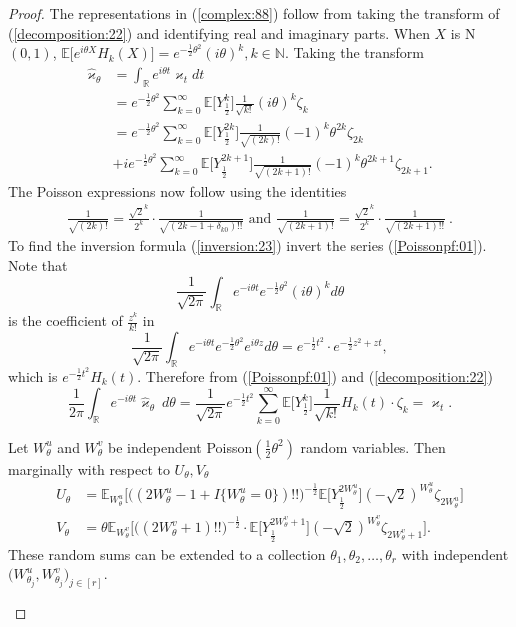 \documentclass[10pt,a4paper]{amsart}
\begin{document}
\begin{proof}
The representations in (\ref{complex:88}) follow from taking the transform of (\ref{decomposition:22})  and identifying real and imaginary parts. When $X$ is N$(0,1)$,
$
\mathbb{E}\big [e^{i\theta X}H_k(X)\big ]
 = e^{-\frac{1}{2}\theta^2}(i\theta)^k, k \in \mathbb{N}.
$
Taking the transform
\begin{align}
\widehat{\varkappa}_\theta & =\int_{\mathbb{R}}e^{i\theta t}\varkappa_tdt\nonumber\\
& = e^{-\frac{1}{2}\theta^2}
\sum_{k=0}^\infty 
\mathbb{E}\big [Y_{\frac{1}{2}}^k\big ]\frac{1}{\sqrt{k!}}(i\theta)^k\zeta_k\label{Poissonpf:01}\\
&= e^{-\frac{1}{2}\theta^2}\sum_{k=0}^\infty 
\mathbb{E}\big [Y_{\frac{1}{2}}^{2k}\big ]\frac{1}{\sqrt{(2k)!}}(-1)^k\theta^{2k}\zeta_{2k}\nonumber\\
&+ie^{-\frac{1}{2}\theta^2}\sum_{k=0}^\infty 
\mathbb{E}\big [Y_{\frac{1}{2}}^{2k+1}\big ]\frac{1}{\sqrt{(2k+1)!}}(-1)^k\theta^{2k+1}\zeta_{2k+1}.
\nonumber
\end{align}
The Poisson expressions now follow using the identities
\begin{align*}
\frac{1}{\sqrt{(2k)!} }= \frac{ \sqrt{2}^k }{2^k}\cdot 
\frac{1}{ \sqrt{(2k-1+\delta_{k0})!!}  }\text{~and~}%
\frac{1}{\sqrt{(2k+1)!}} = \frac{\sqrt{2}^k}{2^k}\cdot \frac{1}{\sqrt{(2k+1)!!}}\ .
\end{align*}
%
To find the inversion formula (\ref{inversion:23}) invert the series (\ref{Poissonpf:01}).
Note that 
\[
\frac{1}{\sqrt{2\pi}}\int_{\mathbb{R}} e^{-i\theta t} e^{-\frac{1}{2}\theta^2}(i\theta)^k d\theta
\]
is the coefficient of $\frac{z^k}{k!}$ in 
\[
\frac{1}{\sqrt{2\pi}}\int_{\mathbb{R}} e^{-i\theta t}
 e^{-\frac{1}{2}\theta^2}e^{i\theta z}d\theta
 = e^{-\frac{1}{2}t^2}\cdot e^{-\frac{1}{2}z^2+zt},
\]
which is $e^{-\frac{1}{2}t^2}H_k(t).$ 
Therefore from (\ref{Poissonpf:01}) and (\ref{decomposition:22})
\[
\frac{1}{2\pi}\int_{\mathbb{R}} e^{-i\theta t}
\widehat{\varkappa}_\theta\ d\theta
= \frac{1}{\sqrt{2\pi}}e^{-\frac{1}{2}t^2}\sum_{k=0}^\infty 
\mathbb{E}\big [Y_{\frac{1}{2}}^k\big ]\frac{1}{\sqrt{k!}}H_k(t)\cdot\zeta_k = \varkappa_t.
\]
\begin{Remark}
Let $W_\theta^u$ and $W_\theta^v$ be independent Poisson$(\frac{1}{2}\theta^2)$ random variables. Then marginally with respect to $U_\theta, V_\theta$
\begin{align}
U_\theta &= 
\mathbb{E}_{W_\theta^u}\Big [
\Big ((2W_\theta^u-1+ I\big \{W_\theta^u=0\big \})!!\Big )^{-\frac{1}{2}}
\mathbb{E}\big [Y_{\frac{1}{2}}^{2W_\theta^u}\big ](-\sqrt{2})^{W_\theta^u } \zeta_{2W_\theta^u}\Big ]
\nonumber\\
V_\theta &= \theta
\mathbb{E}_{W_\theta^v}\Big [
\Big ((2W_\theta^v+1)!! \Big )^{-\frac{1}{2}}
\cdot \mathbb{E}\big [Y_{\frac{1}{2}}^{2W_\theta^v+1}\big ](-\sqrt{2})^{W_\theta^v} \zeta_{2W_\theta^v+1}\Big ].
\nonumber
\end{align}
These random sums can be extended to a collection $\theta_1,\theta_2,\ldots, \theta_r$ with independent $\big (W_{\theta_j}^u, W_{\theta_j}^v\big )_{j\in [r]}$.
\end{Remark}

\end{proof}
\end{document}
